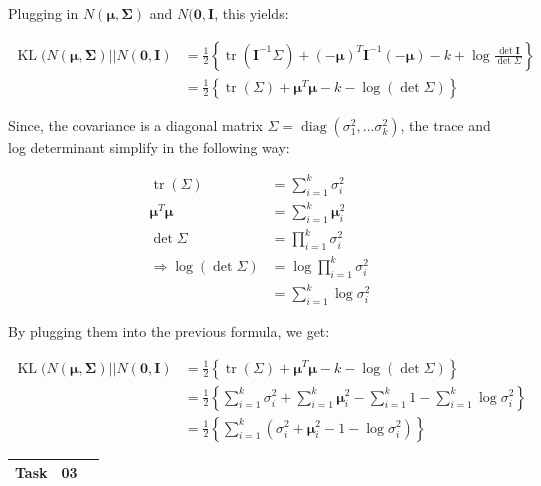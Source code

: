 Plugging in $N(\mathbf{\mu}, \mathbf{\Sigma})$ and $N(\mathbf{0}, \mathbf{I}$, this yields:

\begin{align}
	\operatorname{KL}(N(\mathbf{\mu}, \mathbf{\Sigma})|| N(\mathbf{0}, \mathbf{I}) &= \frac{1}{2} \left\{ \operatorname{tr}(\mathbf{I}^{-1}  \Sigma) + (- \mathbf{\mu})^T \mathbf{I}^{-1} (- \mathbf{\mu}) - k + \log \frac{\det \mathbf{I}}{\det \Sigma} \right\} \\
	&= \frac{1}{2} \left\{ \operatorname{tr}(\Sigma) + \mathbf{\mu}^T \mathbf{\mu} - k - \log( \det \Sigma) \right\}
\end{align}

Since, the covariance is a diagonal matrix $\Sigma = \operatorname{diag}(\sigma_1^2, \dots \sigma_k^2)$, the trace and log determinant simplify in the following way:

\begin{align}
	\operatorname{tr}(\Sigma) &= \sum_{i=1}^k \sigma_i^2 \\
	\mathbf{\mu}^T \mathbf{\mu} &= \sum_{i=1}^k \mathbf{\mu}_i^2 \\
	\det \Sigma &= \prod_{i=1}^k \sigma_i^2 \\
	\Rightarrow \log( \det \Sigma) &= \log \prod_{i=1}^k \sigma_i^2 \\
	&= \sum_{i=1}^k \log \sigma_i^2
\end{align}

By plugging them into the previous formula, we get:

\begin{align}
	\operatorname{KL}(N(\mathbf{\mu}, \mathbf{\Sigma})|| N(\mathbf{0}, \mathbf{I}) &= \frac{1}{2} \left\{ \operatorname{tr}(\Sigma) + \mathbf{\mu}^T \mathbf{\mu} - k - \log( \det \Sigma) \right\} \\
	&= \frac{1}{2} \left\{ \sum_{i=1}^k \sigma_i^2 + \sum_{i=1}^k \mathbf{\mu}_i^2 - \sum_{i=1}^k 1 - \sum_{i=1}^k \log \sigma_i^2 \right\} \\
	&=  \frac{1}{2} \left\{ \sum_{i=1}^k \left( \sigma_i^2 + \mathbf{\mu}_i^2 - 1 - \log \sigma_i^2 \right) \right\} 
\end{align}


\begin{center}
	\begin{tabular}{|rlp{11cm}|}
		\hline
		\textbf{Task} & 03 & \\ \hline
	\end{tabular}
\end{center} 

